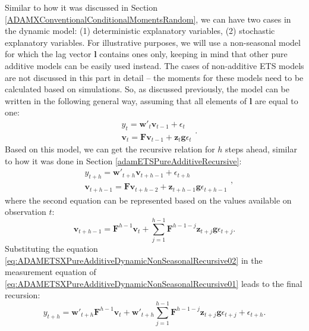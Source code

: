 \documentclass[
]{book}
\theoremstyle{definition}
\theoremstyle{definition}
\theoremstyle{definition}
\theoremstyle{definition}
\theoremstyle{remark}
\begin{document}
Similar to how it was discussed in Section \ref{ADAMXConventionalConditionalMomentsRandom}, we can have two cases in the dynamic model: (1) deterministic explanatory variables, (2) stochastic explanatory variables. For illustrative purposes, we will use a non-seasonal model for which the lag vector \(\mathbf{l}\) contains ones only, keeping in mind that other pure additive models can be easily used instead. The cases of non-additive ETS models are not discussed in this part in detail -- the moments for these models need to be calculated based on simulations. So, as discussed previously, the model can be written in the following general way, assuming that all elements of \(\mathbf{l}\) are equal to one:
\begin{equation}
  \begin{aligned}
    & {y}_{t} = \mathbf{w}'_t \mathbf{v}_{t-1} + \epsilon_t \\
    & \mathbf{v}_t = \mathbf{F} \mathbf{v}_{t-1} + \mathbf{z}_t \mathbf{g} \epsilon_t
  \end{aligned} .
  \label{eq:ADAMETSXPureAdditiveDynamicNonSeasonal}
\end{equation}
Based on this model, we can get the recursive relation for \(h\) steps ahead, similar to how it was done in Section \ref{adamETSPureAdditiveRecursive}:
\begin{equation}
  \begin{aligned}
    & {y}_{t+h} = \mathbf{w}'_{t+h} \mathbf{v}_{t+h-1} + \epsilon_{t+h} \\
    & \mathbf{v}_{t+h-1} = \mathbf{F} \mathbf{v}_{t+h-2} + \mathbf{z}_{t+h-1} \mathbf{g} \epsilon_{t+h-1}
  \end{aligned} ,
  \label{eq:ADAMETSXPureAdditiveDynamicNonSeasonalRecursive01}
\end{equation}
where the second equation can be represented based on the values available on observation \(t\):
\begin{equation}
  \mathbf{v}_{t+h-1} = \mathbf{F}^{h-1} \mathbf{v}_{t} + \sum_{j=1}^{h-1} \mathbf{F}^{h-1-j} \mathbf{z}_{t+j} \mathbf{g} \epsilon_{t+j} .
  \label{eq:ADAMETSXPureAdditiveDynamicNonSeasonalRecursive02}
\end{equation}
Substituting the equation \eqref{eq:ADAMETSXPureAdditiveDynamicNonSeasonalRecursive02} in the measurement equation of \eqref{eq:ADAMETSXPureAdditiveDynamicNonSeasonalRecursive01} leads to the final recursion:
\begin{equation}
    {y}_{t+h} = \mathbf{w}'_{t+h} \mathbf{F}^{h-1} \mathbf{v}_{t} + \mathbf{w}'_{t+h} \sum_{j=1}^{h-1} \mathbf{F}^{h-1-j} \mathbf{z}_{t+j} \mathbf{g} \epsilon_{t+j} + \epsilon_{t+h} .
  \label{eq:ADAMETSXPureAdditiveDynamicNonSeasonalRecursiveFinal}
\end{equation}
\end{document}
